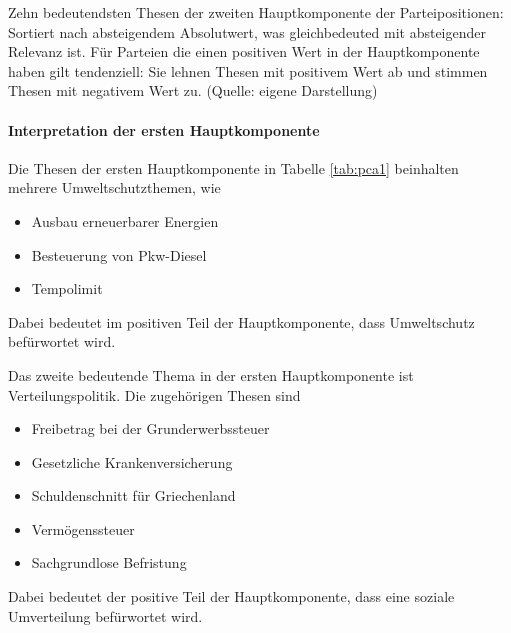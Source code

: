 \begin{table}%
	\centering
	\caption{Zehn bedeutendsten Thesen der zweiten Hauptkomponente der Parteipositionen: Sortiert nach absteigendem Absolutwert, was gleichbedeuted mit absteigender Relevanz ist. Für Parteien die einen positiven Wert in der Hauptkomponente haben gilt tendenziell: Sie lehnen Thesen mit positivem Wert ab und stimmen Thesen mit negativem Wert zu. (Quelle: eigene Darstellung)}
	\label{tab:pca2}
\end{table}

\paragraph{Interpretation der ersten Hauptkomponente}
Die Thesen der ersten Hauptkomponente in Tabelle \ref{tab:pca1} beinhalten mehrere Umweltschutzthemen, wie
\begin{itemize}
	\item Ausbau erneuerbarer Energien
	\item Besteuerung von Pkw-Diesel
	\item Tempolimit
\end{itemize}
Dabei bedeutet im positiven Teil der Hauptkomponente, dass Umweltschutz befürwortet wird.

Das zweite bedeutende Thema in der ersten Hauptkomponente ist Verteilungspolitik. Die zugehörigen Thesen sind
\begin{itemize}
	\item Freibetrag bei der Grunderwerbssteuer
	\item Gesetzliche Krankenversicherung
	\item Schuldenschnitt für Griechenland
	\item Vermögenssteuer
	\item Sachgrundlose Befristung
\end{itemize}
Dabei bedeutet der positive Teil der Hauptkomponente, dass eine soziale Umverteilung befürwortet wird.

